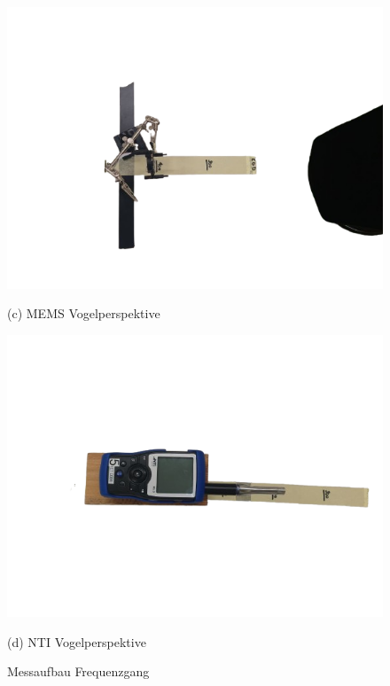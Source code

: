 \documentclass[12pt]{article}
\begin{document}
\begin{figure}[H]
			\ 
			\begin{minipage}
				{0.45\textwidth} \includegraphics[width=\linewidth]{MEMS_Top-removebg} \caption*{(c) MEMS Vogelperspektive} 
			\end{minipage} 
			\hfill 
			\begin{minipage}
				{0.45\textwidth} \includegraphics[width=\linewidth]{NTI_Top-removebg} \caption*{(d) NTI Vogelperspektive} 
			\end{minipage}
			\caption[]{Messaufbau Frequenzgang} \label{fig:messaufbau_frequenzgang} 
		\end{figure}
\end{document}
